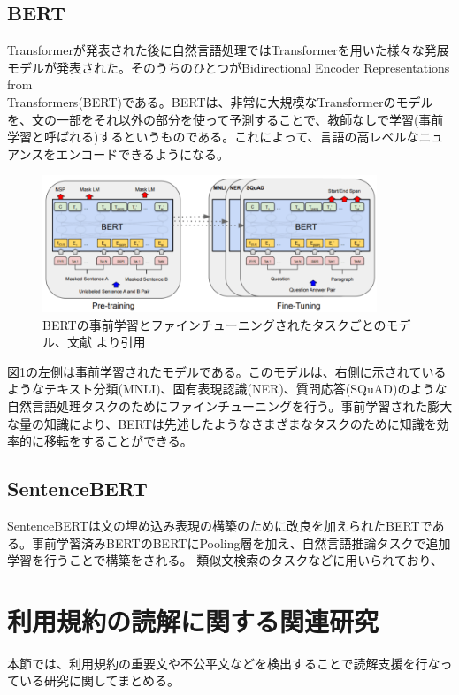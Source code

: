 \subsection{BERT}
Transformerが発表された後に自然言語処理ではTransformerを用いた様々な発展モデルが発表された。そのうちのひとつがBidirectional Encoder Representations from \\Transformers(BERT)\cite{https://doi.org/10.48550/arxiv.1810.04805}である。BERTは、非常に大規模なTransformerのモデルを、文の一部をそれ以外の部分を使って予測することで、教師なしで学習(事前学習と呼ばれる)するというものである。これによって、言語の高レベルなニュアンスをエンコードできるようになる\cite{Sowmya_Vajjala2022-02-04}。
\begin{figure}[h]
  \begin{center}
      \includegraphics[width=10cm]{img/BERT-method.png}
      \caption{BERTの事前学習とファインチューニングされたタスクごとのモデル、文献\cite{https://doi.org/10.48550/arxiv.1810.04805} より引用}
      \label{img:BERT-method}
  \end{center}
\end{figure}
図\ref{img:BERT-method}の左側は事前学習されたモデルである。このモデルは、右側に示されているようなテキスト分類(MNLI)、固有表現認識(NER)、質問応答(SQuAD)のような自然言語処理タスクのためにファインチューニングを行う。事前学習された膨大な量の知識により、BERTは先述したようなさまざまなタスクのために知識を効率的に移転をすることができる。


\subsection{SentenceBERT}
SentenceBERT\cite{arxiv.1908.10084}は文の埋め込み表現の構築のために改良を加えられたBERTである。事前学習済みBERTのBERTにPooling層を加え、自然言語推論タスクで追加学習を行うことで構築をされる。
類似文検索のタスクなどに用いられており、

\section{利用規約の読解に関する関連研究}
本節では、利用規約の重要文や不公平文などを検出することで読解支援を行なっている研究に関してまとめる。

